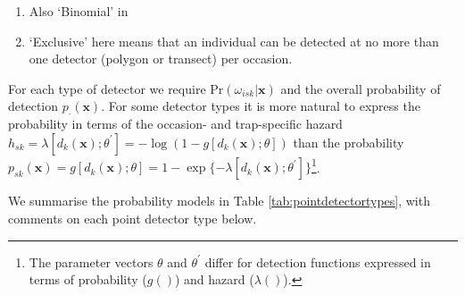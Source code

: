 \documentclass[
]{book}
\providecommand{\tightlist}{%
  \setlength{\itemsep}{0pt}\setlength{\parskip}{0pt}}
\begin{document}
\begin{enumerate}
\def\labelenumi{\arabic{enumi}.}
\tightlist
\item
  Also `Binomial' in \citet{rg11}
\item
  `Exclusive' here means that an individual can be detected at no more than one detector (polygon or transect) per occasion.
\end{enumerate}

For each type of detector we require \(\mbox{Pr}(\omega_{isk} | \mathbf{x})\) and the overall probability of detection \(p_\cdot(\mathbf{x})\). For some detector types it is more natural to express the probability in terms of the occasion- and trap-specific hazard \(h_{sk} = \lambda[d_k(\mathbf{x}); \theta^\prime] = -\log(1-g[d_k(\mathbf{x}); \theta])\) than the probability \(p_{sk} (\mathbf{x}) = g[d_k(\mathbf{x}); \theta] = 1 - \exp\{-\lambda[d_k(\mathbf{x}); \theta^\prime]\}\)\footnote{The parameter vectors \(\theta\) and \(\theta^\prime\) differ for detection functions expressed in terms of probability (\(g()\)) and hazard (\(\lambda()\)).
}.

We summarise the probability models in Table \ref{tab:pointdetectortypes}, with comments on each point detector type below.
\end{document}
